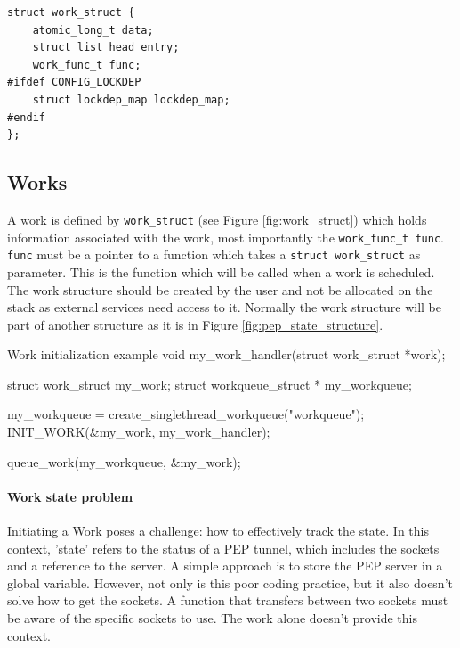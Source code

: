 \documentclass[a4paper,english, 12pt]{report}
\begin{document}
\noindent\begin{minipage}{\linewidth}
\begin{verbatim}
struct work_struct {
    atomic_long_t data;
    struct list_head entry;
    work_func_t func;
#ifdef CONFIG_LOCKDEP
    struct lockdep_map lockdep_map;
#endif
};
\end{verbatim}
\label{fig:work_struct}
\end{minipage}

\subsection{Works}
A work is defined by \verb|work_struct| (see Figure \ref{fig:work_struct}) which holds information associated with the work, most importantly the \verb|work_func_t func|. \verb|func| must be a pointer to a function which takes a \verb|struct work_struct| as parameter. This is the function which will be called when a work is scheduled. The work structure should be created by the user and not be allocated on the stack as external services need access to it. Normally the work structure will be part of another structure as it is in Figure \ref{fig:pep_state_structure}.\\


\begin{autonumlstlisting}[label=lst:work_init]{Work initialization example}
void my_work_handler(struct work_struct *work);

struct work_struct my_work;
struct workqueue_struct * my_workqueue;

my_workqueue = create_singlethread_workqueue("workqueue");
INIT_WORK(&my_work, my_work_handler);

queue_work(my_workqueue, &my_work);
\end{autonumlstlisting}

\paragraph{Work state problem}
Initiating a Work poses a challenge: how to effectively track the state. In this context, 'state' refers to the status of a PEP tunnel, which includes the sockets and a reference to the server. A simple approach is to store the PEP server in a global variable. However, not only is this poor coding practice, but it also doesn't solve how to get the sockets. A function that transfers between two sockets must be aware of the specific sockets to use. The work alone doesn't provide this context.\\
\end{document}
